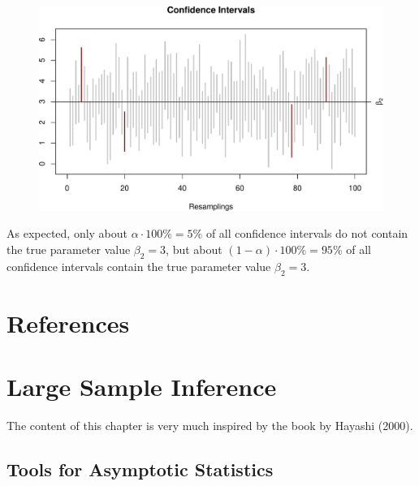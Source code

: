 \documentclass[
  letterpaper,
  DIV=11,
  numbers=noendperiod]{scrreprt}
\theoremstyle{definition}
\theoremstyle{plain}
\theoremstyle{plain}
\theoremstyle{remark}
\begin{document}
\begin{figure}[H]

{\centering \includegraphics{./05-Small-Sample-Inference_files/figure-pdf/unnamed-chunk-25-1.pdf}

}

\end{figure}

As expected, only about \(\alpha\cdot 100\%=5\%\) of all confidence
intervals do not contain the true parameter value \(\beta_2=3\), but
about \((1-\alpha)\cdot 100\%=95\%\) of all confidence intervals contain
the true parameter value \(\beta_2=3\).


\hypertarget{references-1}{%
\chapter*{References}\label{references-1}}


\hypertarget{sec-lsinf}{%
\chapter{Large Sample Inference}\label{sec-lsinf}}

The content of this chapter is very much inspired by the book by Hayashi
(2000).

\hypertarget{tools-for-asymptotic-statistics}{%
\section{Tools for Asymptotic
Statistics}\label{tools-for-asymptotic-statistics}}
\end{document}
